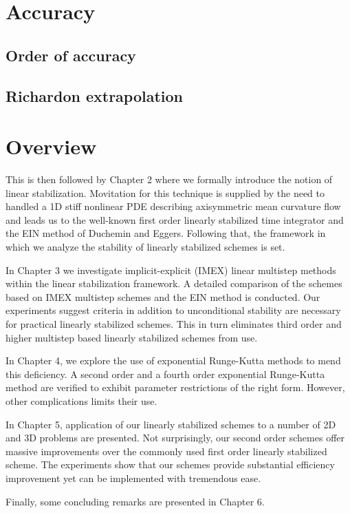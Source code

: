 \section{Accuracy}
\subsection{Order of accuracy}

\subsection{Richardon extrapolation}

\section{Overview}
This is then followed by Chapter 2 where we formally introduce the notion of linear stabilization. Movitation for this technique is supplied by the need to handled a 1D stiff nonlinear PDE describing axisymmetric mean curvature flow and leads us to the well-known first order linearly stabilized time integrator and the EIN method of Duchemin and Eggers. Following that, the framework in which we analyze the stability of linearly stabilized schemes is set. 

In Chapter 3 we investigate implicit-explicit (IMEX) linear multistep methods within the linear stabilization framework. A detailed comparison of the schemes based on IMEX multistep schemes and the EIN method is conducted. Our experiments suggest criteria in addition to unconditional stability are necessary for practical linearly stabilized schemes. This in turn eliminates third order and higher multistep based linearly stabilized schemes from use. 

In Chapter 4, we explore the use of exponential Runge-Kutta methods to mend this deficiency. A second order and a fourth order exponential Runge-Kutta method are verified to exhibit parameter restrictions of the right form. However, other complications limits their use.

In Chapter 5, application of our linearly stabilized schemes to a number of 2D and 3D problems are presented. Not surprisingly, our second order schemes offer massive improvements over the commonly used first order linearly stabilized scheme. The experiments show that our schemes provide substantial efficiency improvement yet can be implemented with tremendous ease. 

Finally, some concluding remarks are presented in Chapter 6.  
 